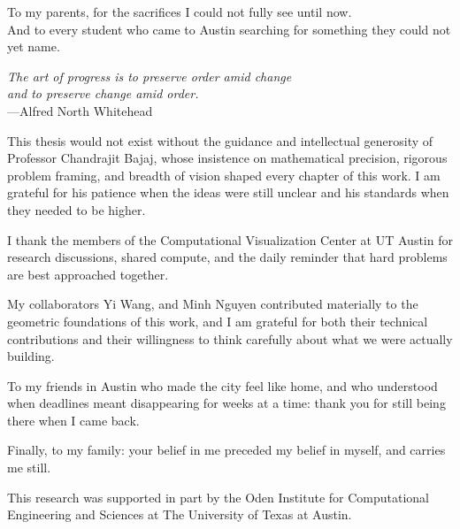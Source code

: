 

\copyrightpage  %

\commcertpage   %

\titlepage      %


\begin{dedication}
To my parents, for the sacrifices I could not fully see until now.\\
And to every student who came to Austin searching for something
they could not yet name.
\end{dedication}

\begin{epigraph}
\begin{center}
\textit{The art of progress is to preserve order amid change\\
and to preserve change amid order.}
\\\hspace{4em}---Alfred North Whitehead
\end{center}
\end{epigraph}

\begin{acknowledgments}
This thesis would not exist without the guidance and intellectual
generosity of Professor Chandrajit Bajaj, whose insistence on
mathematical precision, rigorous problem framing, and breadth of
vision shaped every chapter of this work.
I am grateful for his patience when the ideas were still unclear
and his standards when they needed to be higher.

I thank the members of the Computational Visualization Center at
UT Austin for research discussions, shared compute, and the daily
reminder that hard problems are best approached together.

My collaborators Yi Wang, and Minh Nguyen contributed materially to
the geometric foundations of this work, and I am grateful for both
their technical contributions and their willingness to think
carefully about what we were actually building.

To my friends in Austin who made the city feel like home, and who
understood when deadlines meant disappearing for weeks at a time:
thank you for still being there when I came back.

Finally, to my family: your belief in me preceded my belief in
myself, and carries me still.

This research was supported in part by the Oden Institute for
Computational Engineering and Sciences at The University of Texas
at Austin.
\end{acknowledgments}

